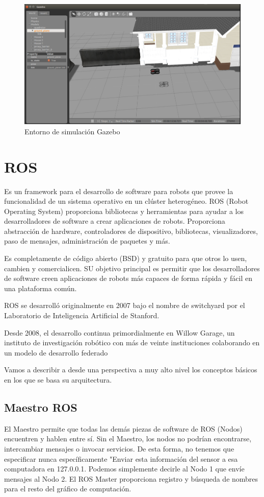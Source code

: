 \begin{figure}[H]
    \centering
    \includegraphics[scale=0.50]{img/gazebo.PNG}
  	\caption{Entorno de simulación Gazebo}
  	\label{fig:gazebo}
\end{figure}

\section{ROS}
\label{sec:ros}

Es un framework para el desarrollo de software para robots que provee la funcionalidad de un sistema operativo en un clúster heterogéneo. ROS (Robot Operating System) proporciona bibliotecas y herramientas para ayudar a los desarrolladores de software a crear aplicaciones de robots. Proporciona abstracción de hardware, controladores de dispositivo, bibliotecas, visualizadores, paso de mensajes, administración de paquetes y más.

 Es completamente de código abierto (BSD) y gratuito para que otros lo usen, cambien y comercialicen. SU objetivo principal es permitir que los desarrolladores de software creen aplicaciones de robots más capaces de forma rápida y fácil en una plataforma común.

ROS se desarrolló originalmente en 2007 bajo el nombre de switchyard por el Laboratorio de Inteligencia Artificial de Stanford.
 
Desde 2008, el desarrollo continua primordialmente en Willow Garage, un instituto de investigación robótico con más de veinte instituciones colaborando en un modelo de desarrollo federado

Vamos a describir a desde una perspectiva a muy alto nivel los conceptos básicos en los que se basa su arquitectura.


\subsection{Maestro ROS}
El Maestro permite que todas las demás piezas de software de ROS (Nodos) encuentren y hablen entre sí. Sin el Maestro, los nodos no podrían encontrarse, intercambiar mensajes o invocar servicios. De esta forma, no tenemos que especificar nunca específicamente "Enviar esta información del sensor a esa computadora en 127.0.0.1. Podemos simplemente decirle al Nodo 1 que envíe mensajes al Nodo 2.
El ROS Master proporciona registro y búsqueda de nombres para el resto del gráfico de computación.

